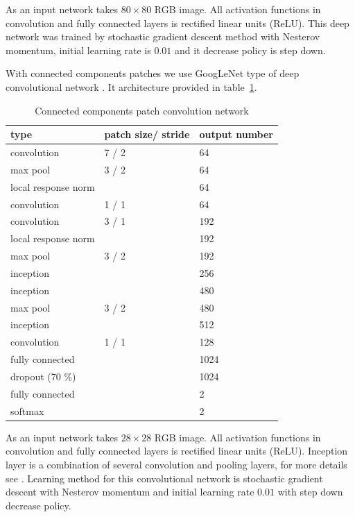 \documentclass[conference,a4paper,twocolumn]{IEEEtran}
\begin{document}
As an input network takes $80\times80$ RGB image. All activation functions in convolution and fully connected layers is rectified linear units (ReLU). This deep network was trained by stochastic gradient descent method with Nesterov momentum, initial learning rate is $0.01$ and it decrease policy is step down.

With connected components patches we use GoogLeNet type of deep convolutional network \cite{Googlenet}. It architecture provided in table~\ref{googlenet_tab}. 
\begin{table}[!h]
\centering
\caption{Connected components patch convolution network}
\label{googlenet_tab}
\begin{tabular}{|l|p{1.3cm}|p{1.3cm}|}
\hline
\textbf{type} & \textbf{patch size/ stride} & \textbf{output number}  \\
\hline
convolution & 7 / 2 & 64 \\
\hline
max pool & 3 / 2 & 64 \\
\hline
local response norm & & 64 \\
\hline
convolution & 1 / 1 & 64 \\
\hline
convolution & 3 / 1 & 192 \\
\hline
local response norm & & 192 \\
\hline
max pool & 3 / 2 & 192 \\
\hline
inception &  & 256 \\
\hline
inception &  & 480 \\
\hline
max pool & 3 / 2 & 480 \\
\hline
inception &  & 512 \\
\hline
convolution & 1 / 1 & 128 \\
\hline
fully connected & & 1024 \\
\hline
dropout (70 \%) & & 1024 \\
\hline
fully connected & & 2 \\
\hline
softmax & & 2 \\
\hline
\end{tabular}
\end{table}

As an input network takes $28\times28$ RGB image. All activation functions in convolution and fully connected layers is rectified linear units (ReLU). Inception layer is a combination of several convolution and pooling layers, for more details see \cite{Googlenet}. Learning method for this convolutional network is stochastic gradient descent with Nesterov momentum and initial learning rate $0.01$ with step down decrease policy. 
\end{document}
